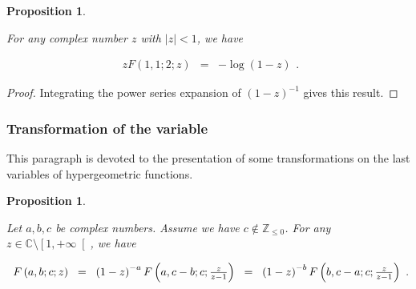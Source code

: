 \documentclass{jams-l}
\newtheorem{proposition}[theorem]{Proposition}
\theoremstyle{definition}
\theoremstyle{remark}
\numberwithin{equation}{section}
\begin{document}
            \begin{proposition}
            \label{PropExpleLog}
        
                For any complex number $z$ with $\left \vert z \right \vert < 1$, we have
            
                \[ \begin{array}{lll}
                        z F \left( 1, 1; 2; z \right) & = & - \log \left( 1 - z \right)
                    \end{array} . \]
        
            \end{proposition}
            
            \begin{proof}
            
                Integrating the power series expansion of $\left( 1-z \right)^{-1}$ gives this result.
            
            \end{proof}
            
        
        \subsubsection{Transformation of the variable}
        
            This paragraph is devoted to the presentation of some transformations on the last variables of hypergeometric functions.
            
            \begin{proposition}
            \label{PropTransformationFraction}
            
                Let $a, b, c$ be complex numbers. Assume we have $c \not \in \mathbb{Z}_{\leqslant 0}$. For any $z \in \mathbb{C} \setminus \left[ 1, + \infty \right[$, we have
                
                \[ \begin{array}{lllll}
                        F \left( a, b; c; z \right) & \hspace{-1.5pt} = \hspace{-1.5pt} & \left( 1 - z \right)^{-a} F \left( a, c - b; c; \frac{z}{z - 1} \right) & \hspace{-1.5pt} = \hspace{-1.5pt} & \left( 1 - z \right)^{-b} F \left( b, c - a; c; \frac{z}{z - 1} \right)
                    \end{array} . \]
            
            \end{proposition}
            
\end{document}

